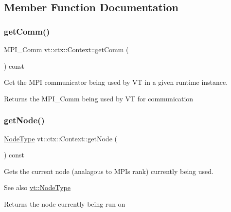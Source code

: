 \subsection{Member Function Documentation}
\mbox{\label{structvt_1_1ctx_1_1_context_a2d4378c97824792991a3410449cf19db}} 
\subsubsection{\texorpdfstring{get\+Comm()}{getComm()}}
{\footnotesize\ttfamily M\+P\+I\+\_\+\+Comm vt\+::ctx\+::\+Context\+::get\+Comm (\begin{DoxyParamCaption}{ }\end{DoxyParamCaption}) const\hspace{0.3cm}{\ttfamily [inline]}}



Get the M\+PI communicator being used by VT in a given runtime instance. 

\begin{DoxyReturn}{Returns}
the {\ttfamily M\+P\+I\+\_\+\+Comm} being used by VT for communication 
\end{DoxyReturn}
\mbox{\label{structvt_1_1ctx_1_1_context_a0d52c263ce8516546a67443d9a86fa5f}} 
\subsubsection{\texorpdfstring{get\+Node()}{getNode()}}
{\footnotesize\ttfamily \hyperlink{namespacevt_a866da9d0efc19c0a1ce79e9e492f47e2}{Node\+Type} vt\+::ctx\+::\+Context\+::get\+Node (\begin{DoxyParamCaption}{ }\end{DoxyParamCaption}) const\hspace{0.3cm}{\ttfamily [inline]}}



Gets the current node (analagous to M\+PI\textquotesingle{}s rank) currently being used. 

\begin{DoxySeeAlso}{See also}
{\ttfamily \hyperlink{namespacevt_a866da9d0efc19c0a1ce79e9e492f47e2}{vt\+::\+Node\+Type}} 
\end{DoxySeeAlso}
\begin{DoxyReturn}{Returns}
the node currently being run on 
\end{DoxyReturn}
\mbox{\label{structvt_1_1ctx_1_1_context_a7f41071aadf6d5fa9e1b6c703c5ff19d}} 
